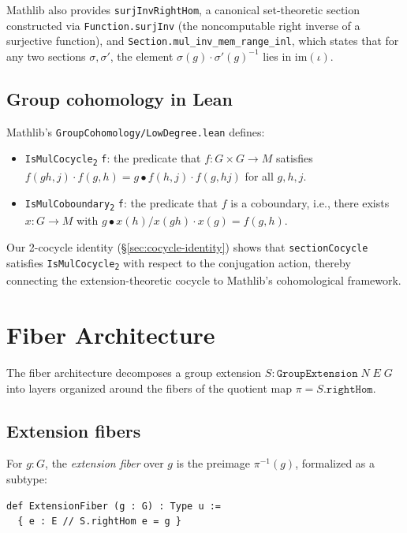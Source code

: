 \documentclass[11pt]{article}
\newcommand{\im}{\mathrm{im}}
\newcommand{\lean}[1]{\texttt{#1}}
\newcommand{\IsMulCocycle}{\lean{IsMulCocycle\textsubscript{2}}}
\newcommand{\IsMulCoboundary}{\lean{IsMulCoboundary\textsubscript{2}}}
\begin{document}
Mathlib also provides \lean{surjInvRightHom}, a canonical set-theoretic section
constructed via \lean{Function.surjInv} (the noncomputable right inverse of a
surjective function), and \lean{Section.mul\_inv\_mem\_range\_inl}, which states
that for any two sections $\sigma, \sigma'$, the element
$\sigma(g) \cdot \sigma'(g)^{-1}$ lies in $\im(\iota)$.

\subsection{Group cohomology in Lean}\label{sec:bg-cohom}

Mathlib's \lean{GroupCohomology/LowDegree.lean} defines:

\begin{itemize}[leftmargin=2em]
  \item \IsMulCocycle{} \lean{f}: the predicate that
    $f : G \times G \to M$ satisfies $f(gh, j) \cdot f(g, h) = g \bullet f(h, j)
    \cdot f(g, hj)$ for all $g, h, j$.

  \item \IsMulCoboundary{} \lean{f}: the predicate that $f$ is a
    coboundary, i.e., there exists $x : G \to M$ with $g \bullet x(h) / x(gh) \cdot
    x(g) = f(g, h)$.
\end{itemize}

Our 2-cocycle identity (\S\ref{sec:cocycle-identity}) shows that
\lean{sectionCocycle} satisfies \IsMulCocycle{} with respect
to the conjugation action, thereby connecting the extension-theoretic cocycle to
Mathlib's cohomological framework.

\section{Fiber Architecture}\label{sec:fiber}

The fiber architecture decomposes a group extension $S : \lean{GroupExtension}\;N\;E\;G$
into layers organized around the fibers of the quotient map $\pi = S.\lean{rightHom}$.

\subsection{Extension fibers}\label{sec:fiber-def}

\begin{definition}\label{def:fiber}
For $g : G$, the \emph{extension fiber} over $g$ is the preimage
$\pi^{-1}(g)$, formalized as a subtype:
\begin{lstlisting}
def ExtensionFiber (g : G) : Type u :=
  { e : E // S.rightHom e = g }
\end{lstlisting}
\end{definition}
\end{document}
